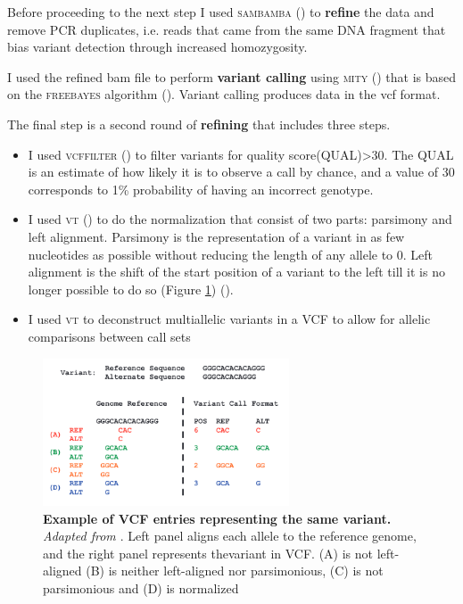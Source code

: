 Before proceeding to the next step I used \textsc{sambamba} (\cite{tarasov2015sambamba}) to \textbf{refine} the data and remove PCR duplicates, i.e. reads that came from the same DNA fragment that bias variant detection through increased homozygosity.\newline

I used the refined bam file to perform \textbf{variant calling} using \textsc{mity} (\cite{puttick2019mity}) that is based on the \textsc{freebayes} algorithm (\cite{garrison2012haplotype}). Variant calling produces data in the vcf format. 

The final step is a second round of \textbf{refining} that includes three steps. 
\begin{itemize}
    \item I used \textsc{vcffilter} (\cite{vcflib}) to filter variants for \gls{quality score}(QUAL)>30. The QUAL is an estimate of how likely it is to observe a call by chance, and a value of 30 corresponds to 1\% probability of having an incorrect genotype.
    \item I used \textsc{vt} (\cite{tan2015unified}) to do the normalization that consist of two parts: parsimony and left alignment. Parsimony is the representation of a variant in as few nucleotides as possible without reducing the length of any allele to 0. Left alignment is the shift of the start position of a variant to the left till it is no longer possible to do so (Figure \ref{fig:vtNorm}) (\cite{tan2015unified}).
    \item I used \textsc{vt} to deconstruct multiallelic variants in a VCF to allow for allelic comparisons between call sets
\end{itemize}

\begin{figure}[H]
\centering
\includegraphics[width=0.65\textwidth]{Fig/vtNormalizeTan.png}
\decoRule
\caption{\textbf{Example  of  VCF  entries  representing  the  same  variant.} \textit{ Adapted from \cite{tan2015unified}}. Left  panel aligns each allele to the reference genome, and the right panel represents thevariant in VCF. (A) is not left-aligned (B) is neither left-aligned nor parsimonious, (C) is not parsimonious and (D) is normalized}
\label{fig:vtNorm}
\end{figure}

